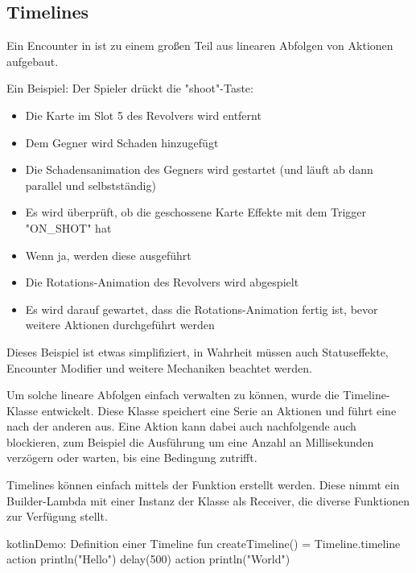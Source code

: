 
\subsection{Timelines}\label{subsec:timelines}

\renewcommand{\kapitelautor}{Autor: Marvin Kurka}

Ein Encounter in \FF ist zu einem großen Teil aus linearen Abfolgen von Aktionen aufgebaut.

Ein Beispiel: Der Spieler drückt die "shoot"-Taste:
\begin{itemize}
    \item Die Karte im Slot 5 des Revolvers wird entfernt
    \item Dem Gegner wird Schaden hinzugefügt
    \item Die Schadensanimation des Gegners wird gestartet (und läuft ab dann parallel und selbstständig)
    \item Es wird überprüft, ob die geschossene Karte Effekte mit dem Trigger "ON\_SHOT" hat
    \item Wenn ja, werden diese ausgeführt
    \item Die Rotations-Animation des Revolvers wird abgespielt
    \item Es wird darauf gewartet, dass die Rotations-Animation fertig ist, bevor weitere Aktionen durchgeführt werden
\end{itemize}

Dieses Beispiel ist etwas simplifiziert, in Wahrheit müssen auch Statuseffekte, Encounter Modifier und weitere Mechaniken
beachtet werden.

Um solche lineare Abfolgen einfach verwalten zu können, wurde die Timeline-Klasse entwickelt.
Diese Klasse speichert eine Serie an Aktionen und führt eine nach der anderen aus.
Eine Aktion kann dabei auch nachfolgende auch blockieren, zum Beispiel die Ausführung um eine Anzahl an
Millisekunden verzögern oder warten, bis eine Bedingung zutrifft.

Timelines können einfach mittels der  Funktion erstellt werden.
Diese nimmt ein Builder-Lambda mit einer Instanz der  Klasse als Receiver, die
diverse Funktionen zur Verfügung stellt.

\begin{codeBlock}{kotlin}{Demo: Definition einer Timeline}
fun createTimeline() = Timeline.timeline {
    action {
        println("Hello")
    }
    delay(500)
    action {
        println("World")
    }
}
\end{codeBlock}

